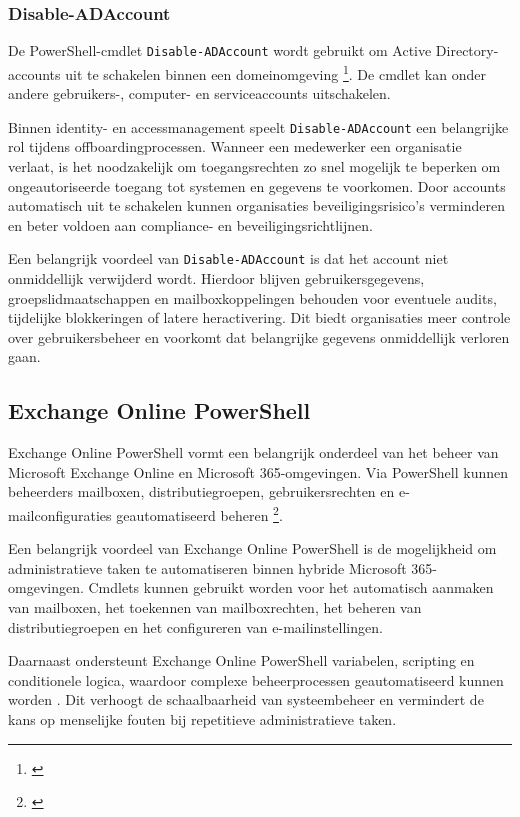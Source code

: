 \subsubsection{Disable-ADAccount}

De PowerShell-cmdlet \texttt{Disable-ADAccount} wordt gebruikt om Active Directory-ac\-counts uit te schakelen binnen een domeinomgeving \footnote{\autocite{Microsoft2025b}}. De cmdlet kan onder andere gebruikers-, computer- en serviceaccounts uitschakelen.

Binnen identity- en accessmanagement speelt \texttt{Disable-ADAccount} een belangrijke rol tijdens offboardingprocessen. Wanneer een medewerker een organisatie verlaat, is het noodzakelijk om toegangsrechten zo snel mogelijk te beperken om ongeautoriseerde toegang tot systemen en gegevens te voorkomen. Door accounts automatisch uit te schakelen kunnen organisaties beveiligingsrisico’s verminderen en beter voldoen aan compliance- en beveiligingsrichtlijnen.

Een belangrijk voordeel van \texttt{Disable-ADAccount} is dat het account niet onmiddellijk verwijderd wordt. Hierdoor blijven gebruikersgegevens, groepslidmaatschappen en mailboxkoppelingen behouden voor eventuele audits, tijdelijke blokkeringen of latere heractivering. Dit biedt organisaties meer controle over gebruikersbeheer en voorkomt dat belangrijke gegevens onmiddellijk verloren gaan.

\subsection{Exchange Online PowerShell}

Exchange Online PowerShell vormt een belangrijk onderdeel van het beheer van Microsoft Exchange Online en Microsoft 365-omgevingen. Via PowerShell kunnen beheerders mailboxen, distributiegroepen, gebruikersrechten en e-mailcon\-fi\-gu\-ra\-ties geautomatiseerd beheren \footnote{\autocite{Microsoft2025c}}. 

Een belangrijk voordeel van Exchange Online PowerShell is de mogelijkheid om administratieve taken te automatiseren binnen hybride Microsoft 365-omgevingen. Cmdlets kunnen gebruikt worden voor het automatisch aanmaken van mailboxen, het toekennen van mailboxrechten, het beheren van distributiegroepen en het configureren van e-mailinstellingen. 

Daarnaast ondersteunt Exchange Online PowerShell variabelen, scripting en conditionele logica, waardoor complexe beheerprocessen geautomatiseerd kunnen worden \autocite{Microsoft2025c}. Dit verhoogt de schaalbaarheid van systeembeheer en vermindert de kans op menselijke fouten bij repetitieve administratieve taken.

